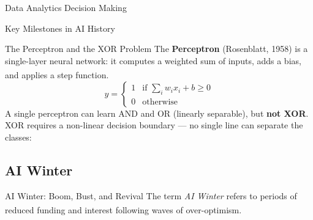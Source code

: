\begin{v3topic}{Data Analytics Decision Making}
\begin{v3topic}{Key Milestones in AI History}
\end{v3topic}
\begin{v3topic}{The Perceptron and the XOR Problem}
        The \textbf{Perceptron} (Rosenblatt, 1958) is a single-layer neural network: it computes a weighted sum of inputs, adds a bias, and applies a step function\textsuperscript{\cite[][p.~13]{Kriesel2007NeuralNetworks}}.
        \begin{equation}
            y = \begin{cases} 1 & \text{if } \sum_{i} w_i x_i + b \geq 0 \\ 0 & \text{otherwise} \end{cases}
        \end{equation}
        A single perceptron can learn AND and OR (linearly separable), but \textbf{not XOR}. XOR requires a non-linear decision boundary --- no single line can separate the classes:
\visualseparator
        \centering
        \label{fig:xor-nonlinearity}
\end{v3topic}
    \subsection{AI Winter}

\begin{v3topic}{AI Winter: Boom, Bust, and Revival}
        The term \emph{AI Winter} refers to periods of reduced funding and interest following waves of over-optimism.\textsuperscript{\cite{adjaouteAI2024}}


\end{v3topic}
\end{v3topic}
